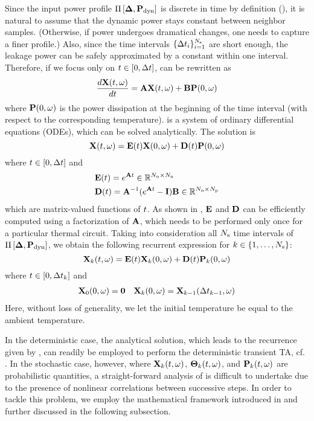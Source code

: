 Since the input power profile $\prof{\mP_\dyn}$ is discrete in time by definition (), it is natural to assume that the dynamic power stays constant between neighbor samples. (Otherwise, if power undergoes dramatical changes, one needs to capture a finer profile.) Also, since the time intervals $\{ \Delta t_i \}_{i = 1}^{N_\text{s}}$ are short enough, the leakage power can be safely approximated by a constant within one interval. Therefore, if we focus only on $t \in [0, \Delta t]$,  can be rewritten as
\begin{equation} \elabel{fourier-ode}
  \frac{d\vX(\t, \o)}{d\t} = \mA \vX(\t, \o) + \mB \vP(0, \o)
\end{equation}
where $\mathbf{P}(0, \omega)$ is the power dissipation at the beginning of the time interval (with respect to the corresponding temperature).  is a system of ordinary differential equations (ODEs), which can be solved analytically. The solution is
\begin{equation} \elabel{ode-solution}
  \vX(\t, \o) = \mE(\t) \vX(0, \o) + \mD(\t) \vP(0, \o)
\end{equation}
where $t \in [0, \Delta t]$ and
\begin{align}
  & \mE(\t) = e^{\mA \t} \in \real^{\nodes \times \nodes} \elabel{e} \\
  & \mD(\t) = \mA^{-1} (e^{\mA \t} - \mI) \mB \in \real^{\nodes \times \cores} \elabel{d}
\end{align}
which are matrix-valued functions of $t$. As shown in \cite{ukhov2012}, $\mE$ and $\mD$ can be efficiently computed using a factorization of $\mA$, which needs to be performed only once for a particular thermal circuit. Taking into consideration all $N_\text{s}$ time intervals of $\prof{\mP_\dyn}$, we obtain the following recurrent expression for $k \in \{ 1, \dotsc, N_\text{s} \}$:
\begin{equation} \elabel{recurrence}
  \vX_k(\t, \o) = \mE(\t) \vX_k(0, \o) + \mD(\t) \vP_k(0, \o)
\end{equation}
where $t \in [ 0, \Delta t_k ]$ and
\begin{align*}
  & \mathbf{X}_0(0, \omega) = \mathbf{0} & \mathbf{X}_k(0, \omega) = \mathbf{X}_{k - 1}(\Delta t_{k - 1}, \omega)
\end{align*}
Here, without loss of generality, we let the initial temperature be equal to the ambient temperature.

In the deterministic case, the analytical solution, which leads to the recurrence given by , can readily be employed to perform the deterministic transient TA, cf. \cite{ukhov2012}. In the stochastic case, however, where $\mathbf{X}_k(t, \omega)$, ${\boldsymbol\Theta}_k(t, \omega)$, and $\mathbf{P}_k(t, \omega)$ are probabilistic quantities, a straight-forward analysis of  is difficult to undertake due to the presence of nonlinear correlations between successive steps. In order to tackle this problem, we employ the mathematical framework introduced in  and further discussed in the following subsection.
